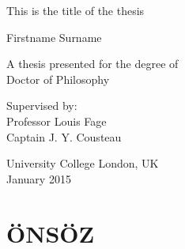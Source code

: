 \documentclass[12pt,turkish,a4paperpaper,]{report}
\date{}
\begin{document}
\begin{titlepage}
    \begin{center}

        
        \vspace*{2.5cm}
        
        \huge
        This is the title of the thesis
        
        \vspace{1.5cm}
        
        \Large
        Firstname Surname

        \vspace{1.5cm}

        \normalsize
        A thesis presented for the degree of\\
        Doctor of Philosophy
        
        \vfill
        
        \normalsize
        Supervised by:\\
        Professor Louis Fage\\
        Captain J. Y. Cousteau

        \vspace{0.8cm}

        
        \normalsize
        University College London, UK\\
        January 2015


    \end{center}
\end{titlepage}

\hypertarget{uxf6nsuxf6z}{%
\chapter*{ÖNSÖZ}\label{uxf6nsuxf6z}}

\setcounter{page}{3}
\end{document}

